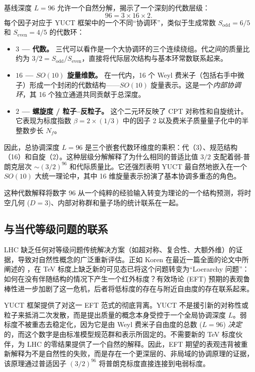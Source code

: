 \documentclass[11pt,a4paper]{article}
\newcommand{\Sodd}{S_{\mathrm{odd}}}
\newcommand{\Seven}{S_{\mathrm{even}}}
\begin{document}
	基线深度 \(L = 96\) 允许一个自然分解，揭示了一个深刻的代数层级：
	\[
	96 = 3 \times 16 \times 2.
	\]
	每个因子对应于 YUCT 框架中的一个不同“协调环”，类似于生成常数 \(\Sodd = 6/5\) 和 \(\Seven = 4/5\) 的代数环：
	
	\begin{itemize}
		\item \textbf{\(3\) — 代数。} 三代可以看作是一个大协调环的三个连续绕组。代之间的质量比约为 \(3/2 = \Sodd/\Seven\)，直接将代际层次结构与基本环常数联系起来。
		\item \textbf{\(16\) — \(SO(10)\) 旋量维数。} 在一代内，16 个 Weyl 费米子（包括右手中微子）形成一个封闭的代数结构——\(SO(10)\) 旋量表示。这是一个\textit{内部协调环}，其 16 个独立通道共同贡献于总深度。
		\item \textbf{\(2\) — 螺旋度 / 粒子–反粒子。} 这个二元环反映了 CPT 对称性和自旋统计。它表现为标度指数 \(\beta = 2 \times (1/3)\) 中的因子 2 以及费米子质量量子化中的半整数步长 \(N_f\)。
	\end{itemize}
	
	因此，总协调深度 \(L = 96\) 是三个嵌套代数环维度的乘积：代（3）、规范结构（16）和自旋（2）。这种层级分解解释了为什么相同的普适比值 \(3/2\) 支配着弱-普朗克层次 \(\sim (3/2)^{96}\) 和代际质量比。它还强烈表明 YUCT 最自然地嵌入在一个 \(SO(10)\) 大统一理论中，其中 16 维旋量表示扮演了基本协调多重态的角色。
	
	这种代数解释将数字 96 从一个纯粹的经验输入转变为理论的一个结构预测，将时空几何 (\(D=3\))、内部对称群和量子场的统计联系在一起。
	
	\subsection{与当代等级问题的联系}
	
	LHC 缺乏任何对等级问题传统解决方案（如超对称、复合性、大额外维）的证据，导致对自然性概念的广泛重新评估。正如 Koren 在最近一篇全面的论文中所阐述的 \cite{Koren2020}，在 TeV 标度上缺乏新的可见态已将这个问题转变为“Loerarchy 问题”：如何在没有伴随结构的情况下产生一个红外标度？有效场论 (EFT) 预期的表观鲁棒性进一步加剧了这一危机，后者将低标度的存在与附近自由度的存在联系起来。
	
	YUCT 框架提供了对这一 EFT 范式的彻底背离。YUCT 不是援引新的对称性或粒子来抵消二次发散，而是提出质量的概念本身受控于一个全局协调深度 \(L\)。弱标度不被重态去稳定化，因为它是由 Weyl 费米子自由度的总数 (\(L=96\)) \emph{决定}的，而这个数字是由标准模型规范群和表示所固定的。不需要新的 TeV 标度伙伴，为 LHC 的零结果提供了一个自然的解释。因此，EFT 期望的表观违背被重新解释为不是自然性的失败，而是存在一个更深层的、非局域的协调原理的证据，该原理通过普适因子 \((3/2)^{96}\) 将普朗克标度直接连接到电弱标度。
	
\end{document}
